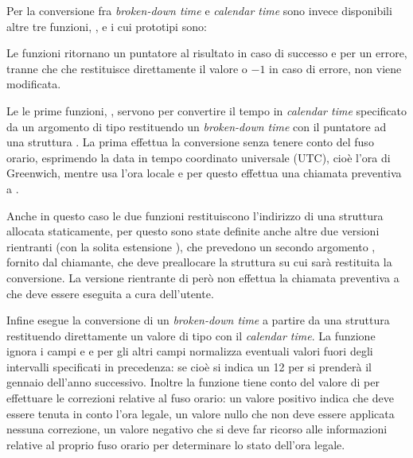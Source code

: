 Per la conversione fra \textit{broken-down time} e \textit{calendar time} sono
invece disponibili altre tre funzioni, ,  e
 i cui prototipi sono:

\begin{funcproto}{

}

{Le funzioni ritornano un puntatore al risultato in caso di successo e
   per un errore, tranne che  che restituisce
  direttamente il valore o $-1$ in caso di errore,  non viene
  modificata.}
\end{funcproto}

Le le prime funzioni, ,  servono per convertire
il tempo in \textit{calendar time} specificato da un argomento di tipo
 restituendo un \textit{broken-down time} con il puntatore ad
una struttura . La prima effettua la conversione senza tenere conto
del fuso orario, esprimendo la data in tempo coordinato universale (UTC), cioè
l'ora di Greenwich, mentre  usa l'ora locale e per questo
effettua una chiamata preventiva a .

Anche in questo caso le due funzioni restituiscono l'indirizzo di una
struttura allocata staticamente, per questo sono state definite anche altre
due versioni rientranti (con la solita estensione ), che prevedono
un secondo argomento , fornito dal chiamante, che deve
preallocare la struttura su cui sarà restituita la conversione. La versione
rientrante di  però non effettua la chiamata preventiva a
 che deve essere eseguita a cura dell'utente.

Infine  esegue la conversione di un \textit{broken-down time} a
partire da una struttura  restituendo direttamente un valore di
tipo  con il \textit{calendar time}. La funzione ignora i campi
 e  e per gli altri campi normalizza eventuali
valori fuori degli intervalli specificati in precedenza: se cioè si indica un
12 per  si prenderà il gennaio dell'anno successivo. Inoltre la
funzione tiene conto del valore di  per effettuare le
correzioni relative al fuso orario: un valore positivo indica che deve essere
tenuta in conto l'ora legale, un valore nullo che non deve essere applicata
nessuna correzione, un valore negativo che si deve far ricorso alle
informazioni relative al proprio fuso orario per determinare lo stato dell'ora
legale.  


